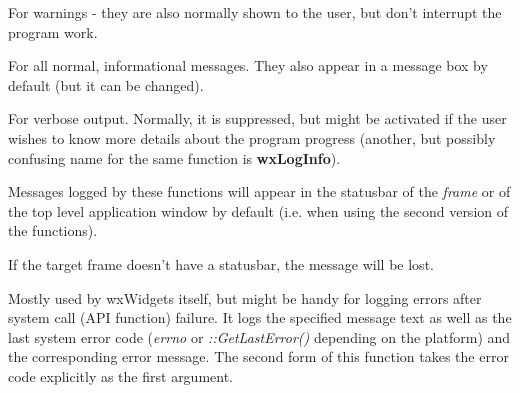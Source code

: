 For warnings - they are also normally shown to the user, but don't interrupt
the program work.


\label{wxlogmessage}



For all normal, informational messages. They also appear in a message box by
default (but it can be changed).

\label{wxlogverbose}



For verbose output. Normally, it is suppressed, but
might be activated if the user wishes to know more details about the program
progress (another, but possibly confusing name for the same function is {\bf wxLogInfo}).


\label{wxlogstatus}





Messages logged by these functions will appear in the statusbar of the {\it
frame} or of the top level application window by default (i.e. when using
the second version of the functions).

If the target frame doesn't have a statusbar, the message will be lost.


\label{wxlogsyserror}



Mostly used by wxWidgets itself, but might be handy for logging errors after
system call (API function) failure. It logs the specified message text as well
as the last system error code ({\it errno} or {\it ::GetLastError()} depending
on the platform) and the corresponding error message. The second form
of this function takes the error code explicitly as the first argument.

